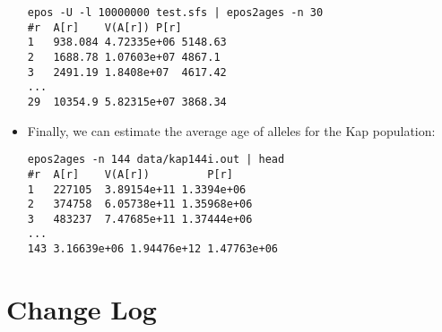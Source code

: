 \documentclass[a4paper]{article}
\begin{document}
\begin{itemize}
\begin{verbatim}
epos -U -l 10000000 test.sfs | epos2ages -n 30
#r	A[r]	V(A[r])	P[r]
1	938.084	4.72335e+06	5148.63
2	1688.78	1.07603e+07	4867.1
3	2491.19	1.8408e+07	4617.42
...
29	10354.9	5.82315e+07	3868.34
\end{verbatim}
\item Finally, we can estimate the average age of alleles for the Kap
  population:
\begin{verbatim}
epos2ages -n 144 data/kap144i.out | head
#r	A[r]	V(A[r])	        P[r]
1	227105	3.89154e+11	1.3394e+06
2	374758	6.05738e+11	1.35968e+06
3	483237	7.47685e+11	1.37444e+06
...
143	3.16639e+06	1.94476e+12	1.47763e+06
\end{verbatim}  
\end{itemize}

\section{Change Log}
\end{document}
